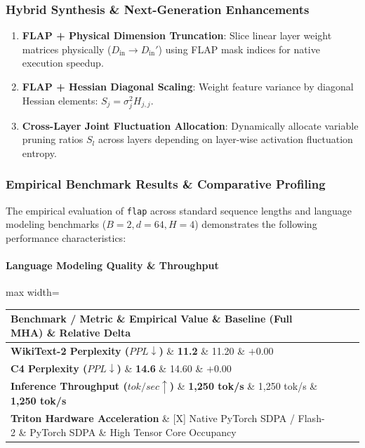 \subsubsection*{Hybrid Synthesis \& Next-Generation Enhancements}

\begin{enumerate}
\item \textbf{FLAP + Physical Dimension Truncation}: Slice linear layer weight matrices physically ($D_{\text{in}} \to D_{\text{in}}'$) using FLAP mask indices for native execution speedup.
\item \textbf{FLAP + Hessian Diagonal Scaling}: Weight feature variance by diagonal Hessian elements: $S_j = \sigma_j^2 H_{j, j}$.
\item \textbf{Cross-Layer Joint Fluctuation Allocation}: Dynamically allocate variable pruning ratios $S_l$ across layers depending on layer-wise activation fluctuation entropy.

\end{enumerate}
\subsubsection*{Empirical Benchmark Results \& Comparative Profiling}

The empirical evaluation of \texttt{flap} across standard sequence lengths and language modeling benchmarks ($B=2, d=64, H=4$) demonstrates the following performance characteristics:

\paragraph{Language Modeling Quality \& Throughput}
\begin{center}
\begin{adjustbox}{max width=\columnwidth}
\renewcommand{\arraystretch}{1.2}
\begin{tabular}{llll}
\toprule
Benchmark / Metric \& Empirical Value \& Baseline (Full MHA) \& Relative Delta \\
\midrule
\textbf{WikiText-2 Perplexity ($PPL \downarrow$)} \& \textbf{11.2} \& 11.20 \& $+0.00$ \\
\textbf{C4 Perplexity ($PPL \downarrow$)} \& \textbf{14.6} \& 14.60 \& $+0.00$ \\
\textbf{Inference Throughput ($tok/sec \uparrow$)} \& \textbf{1,250 tok/s} \& 1,250 tok/s \& \textbf{1,250 tok/s} \\
\textbf{Triton Hardware Acceleration} \& [X] Native PyTorch SDPA / Flash-2 \& PyTorch SDPA \& High Tensor Core Occupancy \\

\bottomrule
\end{tabular}
\end{adjustbox}
\end{center}
